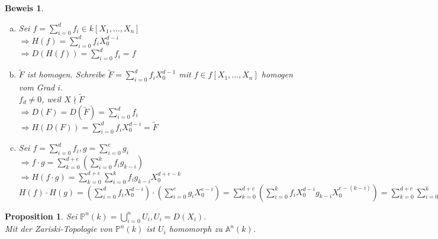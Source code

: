 \documentclass[a4paper,12pt]{report}
\theoremstyle{break}
\newtheorem{Prop}[Def]{Proposition}
\theoremstyle{nonumberbreak}
\newtheorem{Bew}{Beweis}
\theoremstyle{nonumberplain}
\newcommand{\A}{\mathbb{A}}
\newcommand{\IP}{\mathbb{P}}%
\begin{document}
\begin{Bew}\begin{enumerate}[a)]
\item[c)]
	Sei $f=\sum\limits_{i=0}^df_i\in k[X_1,\ldots ,X_n]$\\
	$\Rightarrow H(f)=\sum\limits_{i=0}^df_iX_0^{d-i}$\\
	$\Rightarrow D(H(f))=\sum\limits_{i=0}^df_i=f$
\item[d)]
	$\widetilde F$ ist homogen. Schreibe $\widetilde F=\sum\limits_{i=0}^df_iX_0^{d-1}$ mit $f\in f[X_1,\ldots ,X_n]$ homogen vom Grad $i$.\\
	$f_d\ne0$, weil $X\nmid \widetilde F$\\
	$\Rightarrow D(F)=D(\widetilde F)=\sum\limits_{i=0}^df_i$\\
	$\Rightarrow H(D(F))=\sum\limits_{i=0}^df_iX_0^{d-i}=\widetilde F$
\item[e)]
	Sei $f=\sum\limits_{i=0}^df_i, g= \sum\limits_{i=0}^eg_i$\\
	$\Rightarrow f\cdot g=\sum\limits_{k=0}^{d+e}(\sum\limits_{i=0}^kf_ig_{k-i})$\\
	$\Rightarrow H(f\cdot g)=\sum\limits_{k=0}^{d+e}\sum\limits_{i=0}^kf_ig_{k-i}X_0^{d+e-k}$\\
	$H(f)\cdot H(g)=(\sum\limits_{i=0}^df_iX_0^{d-i})\cdot(\sum\limits_{i=0}^eg_iX_0^{e-i}) = \sum\limits_{k=0}^{d+e}(\sum\limits_{i=0}^kf_iX_0^{d-i}g_{k-i}X_0^{e-(k-i)})=\sum\limits_{k=0}^{d+e}\sum\limits_{i=0}^kf_ig_{k-i}X_0^{d+e-k}$
\end{enumerate}\end{Bew}

\begin{Prop}
Sei $\IP^n(k)=\bigcup\limits_{i=0}^nU_i, U_i=D(X_i)$.\\
Mit der Zariski-Topologie von $\IP^n(k)$ ist $U_i$ homomorph zu $\A^n(k)$.
\end{Prop}
\end{document}
